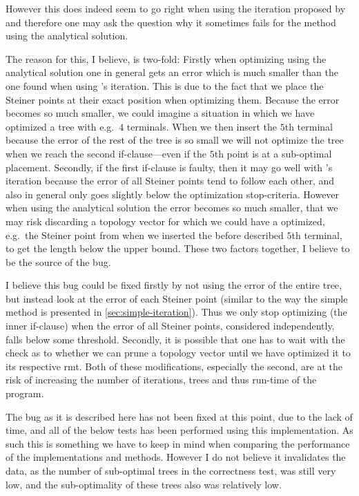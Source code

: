 However this does indeed seem to go right when using the iteration proposed by
\textcite{smith1992} and therefore one may ask the question why it sometimes
fails for the method using the analytical solution.

The reason for this, I believe, is two-fold: Firstly when optimizing using the
analytical solution one in general gets an error which is much smaller than the
one found when using \citeauthor{smith1992}'s iteration. This is due to the fact
that we place the Steiner points at their exact position when optimizing them.
Because the error becomes so much smaller, we could imagine a situation in which
we have optimized a tree with e.g.\ $4$ terminals. When we then insert the $5$th
terminal because the error of the rest of the tree is so small we will not
optimize the tree when we reach the second if-clause---even if the $5$th point
is at a sub-optimal placement. Secondly, if the first if-clause is faulty, then
it may go well with \citeauthor{smith1992}'s iteration because the error of all
Steiner points tend to follow each other, and also in general only goes slightly
below the optimization stop-criteria. However when using the analytical solution
the error becomes so much smaller, that we may risk discarding a topology vector
for which we could have a optimized, e.g.\ the Steiner point from when we
inserted the before described $5$th terminal, to get the length below the upper
bound. These two factors together, I believe to be the source of the bug.

I believe this bug could be fixed firstly by not using the error of the entire
tree, but instead look at the error of each Steiner point (similar to
the way the simple method is presented in \cref{sec:simple-iteration}). Thus we
only stop optimizing (the inner if-clause) when the error of all Steiner points,
considered independently, falls below some threshold. Secondly, it is possible
that one has to wait with the check as to whether we can prune a topology vector
until we have optimized it to its respective \ac{rmt}. Both of these
modifications, especially the second, are at the risk of increasing the number
of iterations, trees and thus run-time of the program.

The bug as it is described here has not been fixed at this point, due to the
lack of time, and all of the below tests has been performed using this
implementation. As such this is something we have to keep in mind when comparing
the performance of the implementations and methods. However I do not believe it
invalidates the data, as the number of sub-optimal trees in the correctness test,
was still very low, and the sub-optimality of these trees also was relatively
low.

